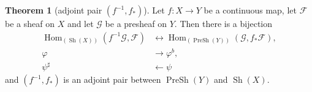 \documentclass[12pt,a4paper]{book}
\newenvironment{prooff}{{\noindent\it\textcolor{cyan!40!black}{Proof}:}\,}{\par}
\theoremstyle{definition}
\newtheorem{theo}[defn]{Theorem}
\begin{document}
\begin{theo}[adjoint pair $(f^{-1},f_*)$]
    Let $f: X \rightarrow Y$ be a continuous map, let $\mathscr{F}$ be a sheaf on $X$ and let $\mathscr{G}$ be a presheaf on $Y$. Then there is a bijection
    $$
        \begin{aligned}
            \operatorname{Hom}_{(\operatorname{Sh}(X))}\left(f^{-1} \mathscr{G}, \mathscr{F}\right) & \leftrightarrow \operatorname{Hom}_{(\operatorname{PreSh}(Y))}\left(\mathscr{G}, f_* \mathscr{F}\right), \\
            \varphi                                                                                 & \rightarrow \varphi^b,                                                                                       \\
            \psi^{\sharp}                                                                           & \leftarrow \psi
        \end{aligned}
    $$
    and $(f^{-1},f_*)$ is an adjoint pair between $\operatorname{PreSh}(Y)$ and $\operatorname{Sh}(X)$.

    \label{theorem:f-1,f_* is an adjoint pair}
\end{theo}
\end{document}

